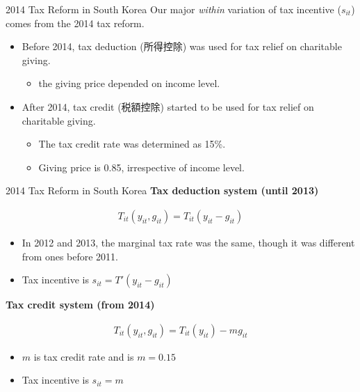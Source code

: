 \documentclass[
  ignorenonframetext,
  aspectratio=169,
]{beamer}
\providecommand{\tightlist}{%
  \setlength{\itemsep}{0pt}\setlength{\parskip}{0pt}}
\begin{document}
\begin{frame}{2014 Tax Reform in South Korea}
\protect\hypertarget{tax-reform-in-south-korea}{}
Our major \emph{within} variation of tax incentive (\(s_{it}\)) comes from the 2014 tax reform.

\begin{itemize}
\tightlist
\item
  Before 2014, tax deduction (所得控除) was used for tax relief on charitable giving.

  \begin{itemize}
  \tightlist
  \item
    the giving price depended on income level.
  \end{itemize}
\item
  After 2014, tax credit (税額控除) started to be used for tax relief on charitable giving.

  \begin{itemize}
  \tightlist
  \item
    The tax credit rate was determined as 15\%.
  \item
    Giving price is 0.85, irrespective of income level.
  \end{itemize}
\end{itemize}
\end{frame}

\begin{frame}{2014 Tax Reform in South Korea}
\protect\hypertarget{tax-reform-in-south-korea-1}{}
\textbf{Tax deduction system (until 2013)}

\begin{align}
  T_{it}(y_{it}, g_{it}) = T_{it}(y_{it} - g_{it})
\end{align}

\begin{itemize}
\tightlist
\item
  In 2012 and 2013, the marginal tax rate was the same, though it was different from ones before 2011.
\item
  Tax incentive is \(s_{it} = T'(y_{it} - g_{it})\)
\end{itemize}

\textbf{Tax credit system (from 2014)}

\begin{align}
  T_{it}(y_{it}, g_{it}) = T_{it}(y_{it}) - m g_{it}
\end{align}

\begin{itemize}
\tightlist
\item
  \(m\) is tax credit rate and is \(m = 0.15\)
\item
  Tax incentive is \(s_{it} = m\)
\end{itemize}
\end{frame}
\end{document}
